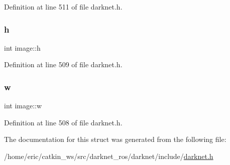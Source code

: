 Definition at line 511 of file darknet.\+h.

\mbox{\label{structimage_a30e2caee481a59608823b3bcec8a139f}} 
\subsubsection{\texorpdfstring{h}{h}}
{\footnotesize\ttfamily int image\+::h}



Definition at line 509 of file darknet.\+h.

\mbox{\label{structimage_aa6480e4024a0d5ca8d36b4145b3ceb43}} 
\subsubsection{\texorpdfstring{w}{w}}
{\footnotesize\ttfamily int image\+::w}



Definition at line 508 of file darknet.\+h.



The documentation for this struct was generated from the following file\+:\begin{DoxyCompactItemize}
\item 
/home/eric/catkin\+\_\+ws/src/darknet\+\_\+ros/darknet/include/\mbox{\hyperlink{darknet_8h}{darknet.\+h}}\end{DoxyCompactItemize}
